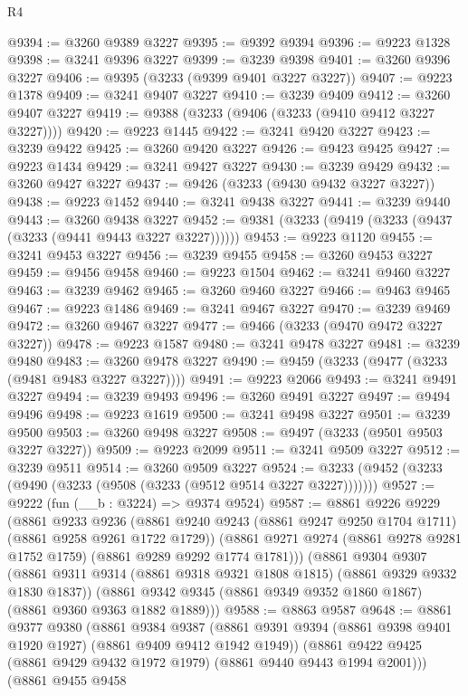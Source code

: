 \begin{lexlean}{R4}
\begin{coremodule}
@9394 := @3260 @9389 @3227
@9395 := @9392 @9394
@9396 := @9223 @1328
@9398 := @3241 @9396 @3227
@9399 := @3239 @9398
@9401 := @3260 @9396 @3227
@9406 := @9395 (@3233 (@9399 @9401 @3227 @3227))
@9407 := @9223 @1378
@9409 := @3241 @9407 @3227
@9410 := @3239 @9409
@9412 := @3260 @9407 @3227
@9419 := @9388 (@3233 (@9406 (@3233 (@9410 @9412 @3227 @3227))))
@9420 := @9223 @1445
@9422 := @3241 @9420 @3227
@9423 := @3239 @9422
@9425 := @3260 @9420 @3227
@9426 := @9423 @9425
@9427 := @9223 @1434
@9429 := @3241 @9427 @3227
@9430 := @3239 @9429
@9432 := @3260 @9427 @3227
@9437 := @9426 (@3233 (@9430 @9432 @3227 @3227))
@9438 := @9223 @1452
@9440 := @3241 @9438 @3227
@9441 := @3239 @9440
@9443 := @3260 @9438 @3227
@9452 := @9381 (@3233 (@9419 (@3233 (@9437 (@3233 (@9441 @9443 @3227 @3227))))))
@9453 := @9223 @1120
@9455 := @3241 @9453 @3227
@9456 := @3239 @9455
@9458 := @3260 @9453 @3227
@9459 := @9456 @9458
@9460 := @9223 @1504
@9462 := @3241 @9460 @3227
@9463 := @3239 @9462
@9465 := @3260 @9460 @3227
@9466 := @9463 @9465
@9467 := @9223 @1486
@9469 := @3241 @9467 @3227
@9470 := @3239 @9469
@9472 := @3260 @9467 @3227
@9477 := @9466 (@3233 (@9470 @9472 @3227 @3227))
@9478 := @9223 @1587
@9480 := @3241 @9478 @3227
@9481 := @3239 @9480
@9483 := @3260 @9478 @3227
@9490 := @9459 (@3233 (@9477 (@3233 (@9481 @9483 @3227 @3227))))
@9491 := @9223 @2066
@9493 := @3241 @9491 @3227
@9494 := @3239 @9493
@9496 := @3260 @9491 @3227
@9497 := @9494 @9496
@9498 := @9223 @1619
@9500 := @3241 @9498 @3227
@9501 := @3239 @9500
@9503 := @3260 @9498 @3227
@9508 := @9497 (@3233 (@9501 @9503 @3227 @3227))
@9509 := @9223 @2099
@9511 := @3241 @9509 @3227
@9512 := @3239 @9511
@9514 := @3260 @9509 @3227
@9524 := @3233 (@9452 (@3233 (@9490 (@3233 (@9508 (@3233 (@9512 @9514 @3227 @3227)))))))
@9527 := @9222 (fun (__b : @3224) => @9374 @9524)
@9587 := @8861
    @9226
    @9229
    (@8861
      @9233
      @9236
      (@8861 @9240 @9243 (@8861 @9247 @9250 @1704 @1711) (@8861 @9258 @9261 @1722 @1729))
      (@8861 @9271 @9274 (@8861 @9278 @9281 @1752 @1759) (@8861 @9289 @9292 @1774 @1781)))
    (@8861
      @9304
      @9307
      (@8861 @9311 @9314 (@8861 @9318 @9321 @1808 @1815) (@8861 @9329 @9332 @1830 @1837))
      (@8861 @9342 @9345 (@8861 @9349 @9352 @1860 @1867) (@8861 @9360 @9363 @1882 @1889)))
@9588 := @8863 @9587
@9648 := @8861
    @9377
    @9380
    (@8861
      @9384
      @9387
      (@8861 @9391 @9394 (@8861 @9398 @9401 @1920 @1927) (@8861 @9409 @9412 @1942 @1949))
      (@8861 @9422 @9425 (@8861 @9429 @9432 @1972 @1979) (@8861 @9440 @9443 @1994 @2001)))
    (@8861
      @9455
      @9458

\end{coremodule}
\end{lexlean}
